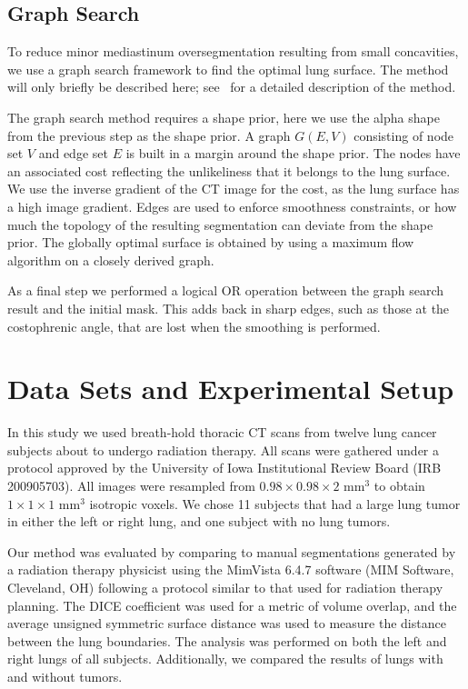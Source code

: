 \documentclass{llncs}
\begin{document}
\subsection{Graph Search}
%
To reduce minor mediastinum oversegmentation resulting from small concavities, we use a graph search framework to find the optimal lung surface. The method will only briefly be described here; see~\cite{li2006} for a detailed description of the method. 

The graph search method requires a shape prior, here we use the alpha shape from the previous step as the shape prior. A graph $G(E,V)$ consisting of node set $V$ and edge set $E$ is built in a margin around the shape prior. The nodes have an associated cost reflecting the unlikeliness that it belongs to the lung surface. We use the inverse gradient of the CT image for the cost, as the lung surface has a high image gradient. Edges are used to enforce smoothness constraints, or how much the topology of the resulting segmentation can deviate from the shape prior. The globally optimal surface is obtained by using a maximum flow algorithm on a closely derived graph. 

As a final step we performed a logical OR operation between the graph search result and the initial mask. This adds back in sharp edges, such as those at the costophrenic angle, that are lost when the smoothing is performed.
 

%
\section{Data Sets and Experimental Setup}
%
In this study we used breath-hold thoracic CT scans from twelve lung cancer subjects about to undergo radiation therapy. All scans were gathered under a protocol approved by the 
University of Iowa Institutional Review Board (IRB 200905703). 
All images were resampled from $0.98\times{}0.98\times{}2$ mm$^3$ to obtain $1\times{}1\times{}1$ mm$^3$ isotropic voxels. We chose 11 subjects that had a large lung tumor in either the left or right lung, and one subject with no lung tumors.

Our method was evaluated by comparing to manual segmentations generated by a radiation therapy physicist using the MimVista 6.4.7 software (MIM Software, Cleveland, OH) following a protocol similar to that used for radiation therapy planning. The DICE coefficient was used for a metric of volume overlap, and the average unsigned symmetric surface distance was used to measure the distance between the lung boundaries. The analysis was performed on both the left and right lungs of all subjects. Additionally, we compared the results of lungs with and without tumors.
\end{document}
